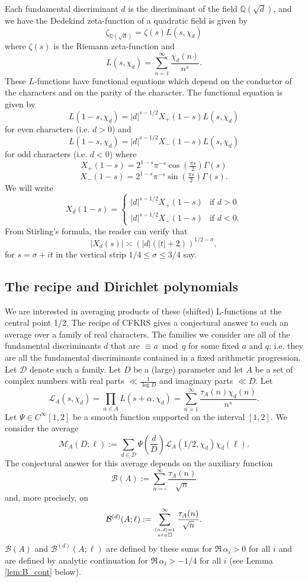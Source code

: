 \documentclass[12pt]{amsart}
\begin{document}
	Each fundamental discriminant $d$ is the discriminant of the field $\mathbb{Q}(\sqrt{d})$, and we have the Dedekind zeta-function of a quadratic field is given by
	$$
	\zeta_{\mathbb{Q}(\sqrt{d})} = \zeta(s) L(s,\chi_d)
	$$
	where $\zeta(s)$ is the Riemann zeta-function and 
	$$
	L(s,\chi_d) = \sum_{n=1}^\infty \frac{\chi_d(n)}{n^s}.
	$$
	These $L$-functions have functional equations which depend on the conductor of the characters and on the parity of the character. The functional equation is given by
	$$
	L(1-s,\chi_d) = |d|^{s-1/2} X_+(1-s) L(s,\chi_d)
	$$
	for even characters (i.e. $d > 0$) and
	$$
	L(1-s,\chi_d) = |d|^{s-1/2} X_-(1-s) L(s,\chi_d)
	$$
	for odd characters (i.e. $d < 0$) where
	$$
	X_+(1-s) = 2^{1-s} \pi^{-s} \cos(\tfrac{\pi s}2) \Gamma(s)
	$$
	$$
	X_-(1-s) = 2^{1-s} \pi^{-s} \sin(\tfrac{\pi s}2) \Gamma(s).
	$$
	We will write
	$$
	X_d(1-s) = \begin{cases}
		|d|^{s-1/2} X_+(1-s) & \mbox{if $d > 0$}\\
		|d|^{s-1/2} X_-(1-s) & \mbox{if $d < 0$}.
	\end{cases}
	$$
	From Stirling's formula, the reader can verify that
	\begin{equation}
		\label{eq:stirling}
		|X_d(s)| \asymp (|d|(|t|+2))^{1/2-\sigma},
	\end{equation}
	for $s = \sigma + it$ in the vertical strip $1/4 \leq \sigma \leq 3/4$ say.
	
	
	\subsection{The recipe and Dirichlet polynomials}
	\label{subsec:the_recipe}
	
	We are interested in averaging products of these (shifted) L-functions at the central point 1/2.
	The recipe of CFKRS gives a conjectural answer to such an average  over a family
	of real characters.  
	The families we consider  are  all of the 
	fundamental discriminants  $d$ that are $\equiv a \bmod q$ for some fixed $a$ and $q$;  i.e. they are all the fundamental discriminants contained in a fixed arithmetic progression.  
	Let $\mathcal D$ denote such a family. Let $D$ be a (large) parameter and let $A$ be a set of complex numbers with  real parts  $\ll \frac{1}{\log D}$  and  imaginary parts
	$\ll D$. Let 
	$$\mathcal {L}_A(s, \chi_d)=\prod_{\alpha\in A} L(s+\alpha,\chi_d)=\sum_{n=1}^\infty \frac{\tau_A(n)\chi_d(n)}{n^s}.$$
	Let $\Psi  \in C^\infty[1,2]$ be a smooth function supported on the interval $[1,2]$. We consider the average
	$$ \mathcal M_A(D;\ell):= \sum_{d\in \mathcal D} \Psi\left(\frac dD\right) \mathcal L_A(1/2,\chi_d) \chi_d(\ell).$$
	The conjectural answer for this average depends on the auxiliary function
	$$\mathcal B(A):=\sum_{ n=\square}^\infty \frac{\tau_A(n)}{\sqrt{n}}$$
	and, more precisely, on 
	$$
	\mathcal B^{(d)}(A;\ell):=\sum_{(n,d)=1\atop n\ell=\square}^\infty \frac{\tau_A(n)}{\sqrt{n}}.
	$$
	$\mathcal{B}(A)$ and $\mathcal{B}^{(d)}(A;\ell)$ are defined by these sums for $\Re\, \alpha_i  > 0$ for all $i$ and are defined by analytic continuation for $\Re\, \alpha_i > -1/4$ for all $i$ (see Lemma \ref{lem:B_cont} below).
	
\end{document}
